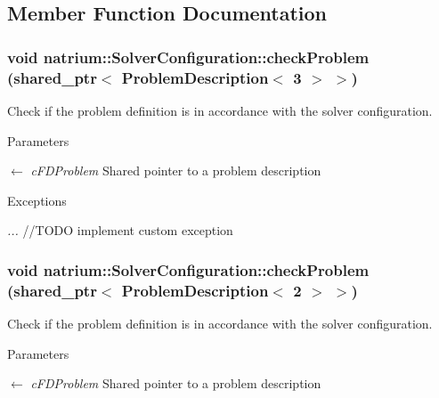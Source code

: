\subsection{Member Function Documentation}
\hypertarget{classnatrium_1_1SolverConfiguration_ae889a75ea132979964b8c9dcf631956b}{
\subsubsection[{checkProblem}]{\setlength{\rightskip}{0pt plus 5cm}void natrium::SolverConfiguration::checkProblem (shared\_\-ptr$<$ {\bf ProblemDescription}$<$ 3 $>$ $>$)}}
\label{classnatrium_1_1SolverConfiguration_ae889a75ea132979964b8c9dcf631956b}


Check if the problem definition is in accordance with the solver configuration. 
\begin{DoxyParams}{Parameters}
\item[\mbox{$\leftarrow$} {\em cFDProblem}]Shared pointer to a problem description\end{DoxyParams}

\begin{DoxyExceptions}{Exceptions}
\item[{\em ...}]//TODO implement custom exception \end{DoxyExceptions}
\hypertarget{classnatrium_1_1SolverConfiguration_a5299ddfbe762f89f2cd0dfa01bc70685}{
\subsubsection[{checkProblem}]{\setlength{\rightskip}{0pt plus 5cm}void natrium::SolverConfiguration::checkProblem (shared\_\-ptr$<$ {\bf ProblemDescription}$<$ 2 $>$ $>$)}}
\label{classnatrium_1_1SolverConfiguration_a5299ddfbe762f89f2cd0dfa01bc70685}


Check if the problem definition is in accordance with the solver configuration. 
\begin{DoxyParams}{Parameters}
\item[\mbox{$\leftarrow$} {\em cFDProblem}]Shared pointer to a problem description\end{DoxyParams}

